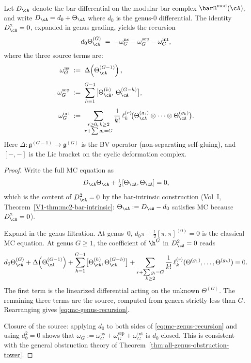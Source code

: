 \begin{theorem}[MC recursion from $D_\cA^2 = 0$; \ClaimStatusProvedHere]
Let $D_\cA$ denote the bar differential on the modular bar complex
$\barB^{\mathrm{mod}}(\cA)$, and write $D_\cA = d_0 + \Theta_\cA$ where
$d_0$ is the genus-$0$ differential. The identity $D_\cA^2 = 0$,
expanded in genus grading, yields the recursion
\begin{equation}
\label{eq:mc-genus-recursion}
d_0 \Theta_\cA^{(G)}
\;=\;
-\omega_G^{\mathrm{ns}} - \omega_G^{\mathrm{sep}} - \omega_G^{\mathrm{int}},
\end{equation}
where the three source terms are:
\begin{align}
\omega_G^{\mathrm{ns}}
&\;:=\;
\Delta\!\left(\Theta_\cA^{(G-1)}\right),
\\[4pt]
\omega_G^{\mathrm{sep}}
&\;:=\;
\sum_{h=1}^{G-1}
\bigl[\Theta_\cA^{(h)},\,\Theta_\cA^{(G-h)}\bigr],
\\[4pt]
\omega_G^{\mathrm{int}}
&\;:=\;
\sum_{\substack{r \geq 0,\, k \geq 2 \\ r + \sum g_i = G}}
\frac{1}{k!}\,
\ell_k^{(r)}\!\bigl(
\Theta_\cA^{(g_1)} \otimes \cdots \otimes \Theta_\cA^{(g_k)}
\bigr).
\end{align}
Here $\Delta: \mathfrak{g}^{(G-1)} \to \mathfrak{g}^{(G)}$ is the BV operator
(non-separating self-gluing), and $[-,-]$ is the Lie bracket on the cyclic
deformation complex.
\end{theorem}

\begin{proof}
Write the full MC equation as
\[
D_\cA \Theta_\cA + \tfrac{1}{2}[\Theta_\cA, \Theta_\cA] = 0,
\]
which is the content of $D_\cA^2 = 0$ by the bar-intrinsic construction
(Vol~I, Theorem~\ref*{V1-thm:mc2-bar-intrinsic}: $\Theta_\cA := D_\cA - d_0$
satisfies MC because $D_\cA^2 = 0$).

Expand in the genus filtration. At genus~$0$, $d_0 \pi + \frac{1}{2}[\pi,\pi]^{(0)} = 0$
is the classical MC equation. At genus $G \geq 1$, the coefficient of $\h^G$ in
$D_\cA^2 = 0$ reads
\[
d_0 \Theta_\cA^{(G)}
+ \Delta\!\left(\Theta_\cA^{(G-1)}\right)
+ \sum_{h=1}^{G-1} \bigl[\Theta_\cA^{(h)}, \Theta_\cA^{(G-h)}\bigr]
+ \sum_{\substack{r + \sum g_i = G \\ k \geq 2}}
\frac{1}{k!}\,\ell_k^{(r)}(\Theta^{(g_1)},\ldots,\Theta^{(g_k)})
= 0.
\]
The first term is the linearized differential acting on the unknown $\Theta^{(G)}$.
The remaining three terms are the source, computed from genera strictly less than $G$.
Rearranging gives \eqref{eq:mc-genus-recursion}.

Closure of the source: applying $d_0$ to both sides of \eqref{eq:mc-genus-recursion}
and using $d_0^2 = 0$ shows that $\omega_G := \omega_G^{\mathrm{ns}} + \omega_G^{\mathrm{sep}}
+ \omega_G^{\mathrm{int}}$ is $d_0$-closed. This is consistent with the general obstruction
theory of Theorem~\ref{thm:all-genus-obstruction-tower}.
\end{proof}

